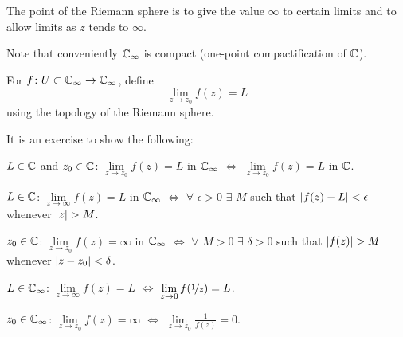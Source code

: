\documentclass[10pt,aspectratio=169]{beamer}
\begin{document}
\begin{frame}
%
%
The point of the Riemann sphere is to give the value $\infty$ to certain
limits and to allow limits as $z$ tends to $\infty$.

\medskip
\pause

Note that conveniently
${\mathbb{C}}_\infty$ is compact (one-point compactification of ${\mathbb{C}}$).

\medskip
\pause
For $f \colon U \subset {\mathbb{C}}_\infty \to {\mathbb{C}}_\infty$, define
\begin{equation*}
\lim_{z \to z_0} f(z) = L
\end{equation*}
using the topology of the Riemann sphere.

\medskip
\pause

It is an exercise to show the following:

\medskip
\pause

$L \in {\mathbb{C}}$ and $z_0 \in {\mathbb{C}}$: \quad
$\lim\limits_{z\to z_0} f(z) = L$ in ${\mathbb{C}}_\infty$ 
$\Leftrightarrow$ $\lim\limits_{z \to z_0} f(z) = L$ in ${\mathbb{C}}$.

\medskip
\pause
$L \in {\mathbb{C}}$: \quad
$\lim\limits_{z\to \infty} f(z) = L$ in ${\mathbb{C}}_\infty$
$\Leftrightarrow$ $\forall$ $\epsilon > 0$ $\exists$ $M$ such that
$\lvert {f(z)-L} \rvert < \epsilon$ whenever $\lvert {z} \rvert > M$.

\medskip
\pause
$z_0 \in {\mathbb{C}}$: \quad
$\lim\limits_{z\to z_0} f(z) = \infty$ in ${\mathbb{C}}_\infty$
$\Leftrightarrow$ $\forall$ $M > 0$ $\exists$ $\delta > 0$ such that
$\lvert {f(z)} \rvert > M$ whenever $\lvert {z-z_0} \rvert < \delta$.

\medskip
\pause

$L \in {\mathbb{C}}_\infty$: \quad
$\lim\limits_{z\to\infty} f(z) = L$ $\Leftrightarrow$
$\lim\limits_{z \to 0} f(\nicefrac{1}{z}) = L$.

\medskip
\pause

$z_0 \in {\mathbb{C}}_\infty$: \quad
$\lim\limits_{z\to z_0} f(z) = \infty$ $\Leftrightarrow$
$\lim\limits_{z \to z_0} \frac{1}{f(z)} = 0$.
\end{frame}
\end{document}
